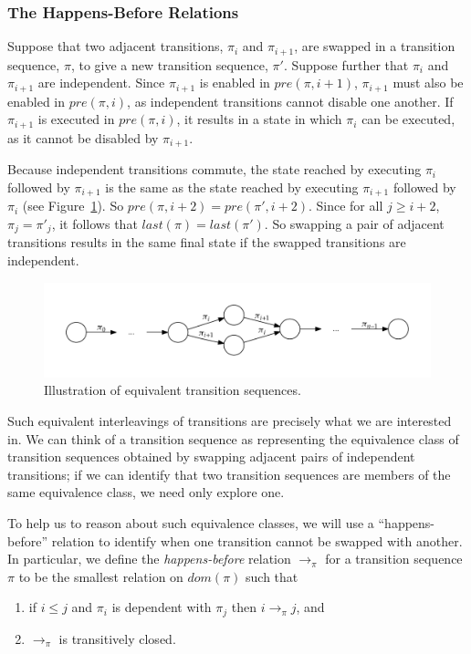 \documentclass[12pt,a4paper,twoside,openright]{report}
\begin{document}
\subsubsection{The Happens-Before Relations}\label{sec:happens-before}

Suppose that two adjacent transitions, $\pi_i$ and $\pi_{i+1}$,
are swapped in a
transition sequence, $\pi$, to give a new
transition sequence, $\pi'$. Suppose further
that $\pi_i$ and $\pi_{i+1}$ are independent.
Since $\pi_{i+1}$ is enabled in $\textit{pre}(\pi, i+1)$,
$\pi_{i+1}$ must also be enabled in $\textit{pre}(\pi, i)$,
as independent transitions cannot disable one another.
If $\pi_{i+1}$
is executed in $\textit{pre}(\pi, i)$,
it results in a state in which $\pi_i$
can be executed, as it cannot be disabled by $\pi_{i+1}$.

Because independent transitions commute, the state reached by
executing $\pi_i$ followed by $\pi_{i+1}$ is the same
as the state reached by executing $\pi_{i+1}$ followed
by $\pi_i$ (see Figure~\ref{fig:sequence-equivalence}).
So $\textit{pre}(\pi, i+2) = \textit{pre}(\pi', i+2)$. Since
for all $j \geq i + 2$, $\pi_j = \pi'_j$, it follows that
$\textit{last}(\pi) = \textit{last}(\pi')$. So swapping
a pair of adjacent transitions results in the same
final state if the swapped transitions are independent.

\begin{figure}
	\centering
	\includegraphics[width=\textwidth]{seqequiv}
	\caption{Illustration of equivalent transition sequences.}
	\label{fig:sequence-equivalence}
\end{figure}

Such equivalent interleavings
of transitions are precisely what we are interested in.
We can think of a transition sequence as representing
the equivalence class of transition sequences obtained
by swapping adjacent pairs of independent transitions;
if we can identify that two transition sequences are
members of the same equivalence class, we need only
explore one.

To help us to reason about such equivalence classes,
we will use a ``happens-before'' relation to identify
when one transition cannot be swapped with another.
In particular, we define the \emph{happens-before}
relation $\longrightarrow_\pi$ for a transition
sequence $\pi$ to be the smallest relation on
$\textit{dom}(\pi)$ such that
\begin{enumerate}
	\item if $i \leq j$ and $\pi_i$ is dependent with
		$\pi_j$ then $i \longrightarrow_\pi j$, and
	\item $\longrightarrow_\pi$ is transitively closed.
\end{enumerate}
\end{document}
